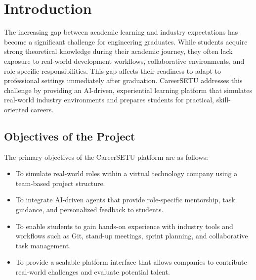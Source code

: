 \documentclass[12pt,a4paper]{report}
\begin{document}
\begin{acronym}[ACRONYM]
\end{acronym}

\newpage
{}

\chapter{Introduction}

The increasing gap between academic learning and industry expectations has become a
significant challenge for engineering graduates. While students acquire strong theoretical
knowledge during their academic journey, they often lack exposure to real-world
development workflows, collaborative environments, and role-specific responsibilities.
This gap affects their readiness to adapt to professional settings immediately after
graduation. CareerSETU addresses this challenge by providing an AI-driven, experiential
learning platform that simulates real-world industry environments and prepares students
for practical, skill-oriented careers.

\section{Objectives of the Project}

The primary objectives of the CareerSETU platform are as follows:
\begin{itemize}
    \item To simulate real-world roles within a virtual technology company using a
    team-based project structure.
    \item To integrate AI-driven agents that provide role-specific mentorship, task
    guidance, and personalized feedback to students.
    \item To enable students to gain hands-on experience with industry tools and
    workflows such as Git, stand-up meetings, sprint planning, and collaborative task
    management.
    \item To provide a scalable platform interface that allows companies to contribute
    real-world challenges and evaluate potential talent.
\end{itemize}
\end{document}
